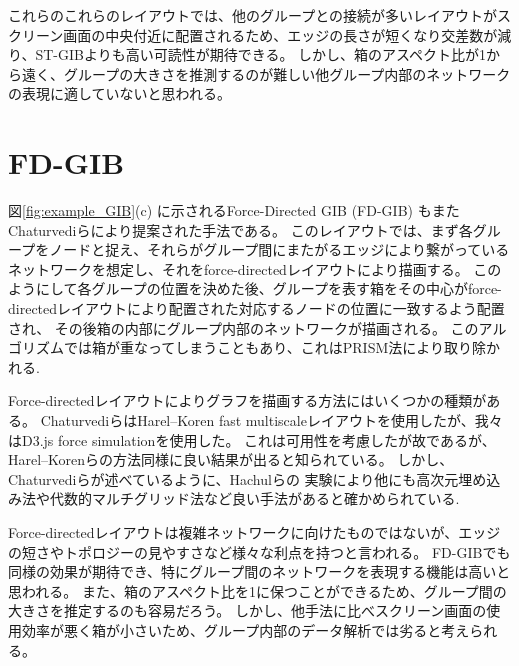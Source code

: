 \documentclass{kuee}
\begin{document}
これらのこれらのレイアウトでは、他のグループとの接続が多いレイアウトがスクリーン画面の中央付近に配置されるため、エッジの長さが短くなり交差数が減り、ST-GIBよりも高い可読性が期待できる。
しかし、箱のアスペクト比が1から遠く、グループの大きさを推測するのが難しい他グループ内部のネットワークの表現に適していないと思われる。

\section{FD-GIB}
図\ref{fig:example_GIB}(c) に示されるForce-Directed GIB (FD-GIB) もまたChaturvediらにより提案された手法である。
このレイアウトでは、まず各グループをノードと捉え、それらがグループ間にまたがるエッジにより繋がっているネットワークを想定し、それをforce-directedレイアウトにより描画する。
このようにして各グループの位置を決めた後、グループを表す箱をその中心がforce-directedレイアウトにより配置された対応するノードの位置に一致するよう配置され、
その後箱の内部にグループ内部のネットワークが描画される。
このアルゴリズムでは箱が重なってしまうこともあり、これはPRISM法により取り除かれる\cite{gansner2008efficient}.

Force-directedレイアウトによりグラフを描画する方法にはいくつかの種類がある。
ChaturvediらはHarel--Koren fast multiscaleレイアウト\cite{harel2002graph}を使用したが、我々はD3.js force simulation\cite{Bostock:2011:DDD:2068462.2068631}を使用した。
これは可用性を考慮したが故であるが、Harel--Korenらの方法同様に良い結果が出ると知られている。
しかし、Chaturvediらが述べているように\cite{chaturvedi2014group}、Hachulらの
実験\cite{Hachul:2005:ECF:2102325.2102348}により他にも高次元埋め込み法\cite{harel2002graph}や代数的マルチグリッド法\cite{koren2003drawing}など良い手法があると確かめられている.

Force-directedレイアウトは複雑ネットワークに向けたものではないが、エッジの短さやトポロジーの見やすさなど様々な利点を持つと言われる\cite{Kobourov2013ForceDirectedDA}。
FD-GIBでも同様の効果が期待でき、特にグループ間のネットワークを表現する機能は高いと思われる。
また、箱のアスペクト比を1に保つことができるため、グループ間の大きさを推定するのも容易だろう。
しかし、他手法に比べスクリーン画面の使用効率が悪く箱が小さいため、グループ内部のデータ解析では劣ると考えられる。
\end{document}
